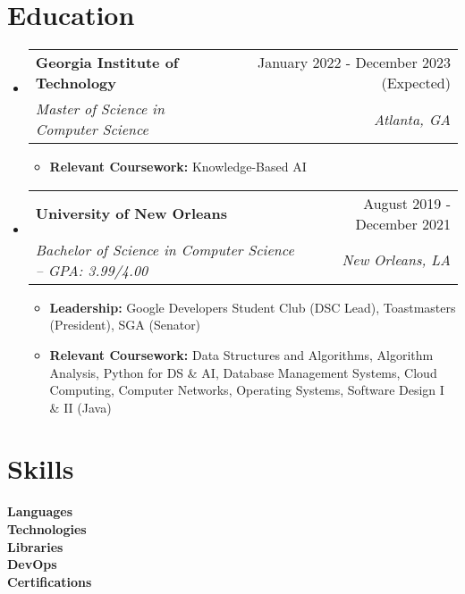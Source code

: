 \documentclass[letterpaper,11pt]{article}
\makeatletter
\newcommand{\resumeItem}[1]{
  \item\small{
    {#1 \vspace{-2pt}}
  }
}
\newcommand{\resumeSubheading}[4]{
  \vspace{-2pt}\item
    \begin{tabular*}{0.97\textwidth}[t]{l@{\extracolsep{\fill}}r}
      \textbf{#1} & #2 \\
      \textit{\small#3} & \textit{\small #4} \\
    \end{tabular*}\vspace{-7pt}
}
\newcommand{\resumeSubHeadingListStart}{\begin{itemize}[leftmargin=0.15in, label={}]}
\newcommand{\resumeSubHeadingListEnd}{\end{itemize}}
\newcommand{\resumeItemListStart}{\begin{itemize}}
\newcommand{\resumeItemListEnd}{\end{itemize}\vspace{-5pt}}
\makeatother
\begin{document}
\section{Education}
  \resumeSubHeadingListStart
    \resumeSubheading
      {Georgia Institute of Technology}{January 2022 - December 2023 (Expected)}
      {Master of Science in Computer Science}{Atlanta, GA}
      \resumeItemListStart
        \resumeItem{\textbf{Relevant Coursework:} Knowledge-Based AI}
        
      \resumeItemListEnd
    \resumeSubheading
      {University of New Orleans}{August 2019 - December 2021}
      {Bachelor of Science in Computer Science -- GPA: 3.99/4.00}{New Orleans, LA}
      \resumeItemListStart
        \resumeItem{\textbf{Leadership:} Google Developers Student Club (DSC Lead), Toastmasters (President), SGA (Senator)}
        \resumeItem{\textbf{Relevant Coursework:} Data Structures and Algorithms, Algorithm Analysis, Python for DS \& AI, Database Management Systems, Cloud Computing, Computer Networks, Operating Systems, Software Design I \& II (Java)}
      \resumeItemListEnd
  \resumeSubHeadingListEnd
  

%
\section{Skills}
 \begin{itemize}[leftmargin=0.15in, label={}]
    \small{\item{
     \textbf{Languages}\hspace*{1cm}{Java, Python, HTML/CSS, JavaScript, SQL} \\
     \textbf{Technologies}\hspace*{0.6cm}{Git, Unity, Jupyter Notebook} \\
     \textbf{Libraries}\hspace*{1.25cm}{NumPy, Pandas, Matplotlib, scikit-learn} \\
     \textbf{DevOps}\hspace*{1.4cm}{Amazon Web Services (AWS), Terraform, GitLab CI/CD} \\
     \textbf{Certifications}\hspace*{0.4cm}{AWS Solutions Architect - Associate, AWS Cloud Practitioner} 
    }}
 \end{itemize}
\end{document}
